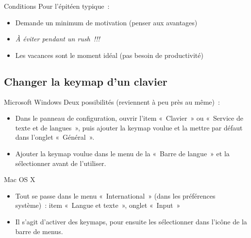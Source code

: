 \begin{frame}{Conditions}
    Pour l’épitéen typique~:
    \begin{itemize}
        \item Demande un minimum de motivation (penser aux avantages) \pause

        \item \emph{À éviter pendant un rush~!!!} \pause

        \item Les vacances sont le moment idéal (pas besoin de productivité)
    \end{itemize}
\end{frame}



\subsection{Changer la keymap d’un clavier}

\begin{frame}{Microsoft Windows}
    Deux possibilités (reviennent à peu près au même)~:
    \pause
    \begin{itemize}
        \item Dans le panneau de configuration, ouvrir l’item «~Clavier~» ou
          «~Service de texte et de langues~», puis ajouter la keymap voulue et
          la mettre par défaut dans l’onglet «~Général~». \pause

        \item Ajouter la keymap voulue dans le menu de la «~Barre de langue~»
          et la sélectionner avant de l’utiliser.
    \end{itemize}
\end{frame}

\begin{frame}{Mac OS X}
    \begin{itemize}
        \item Tout se passe dans le menu «~International~» (dans les
          préférences système)~: item «~Langue et texte~», onglet «~Input~»
          \pause

        \item Il s’agit d’activer des keymaps, pour ensuite les sélectionner
          dans l’icône de la barre de menus.
    \end{itemize}
\end{frame}


